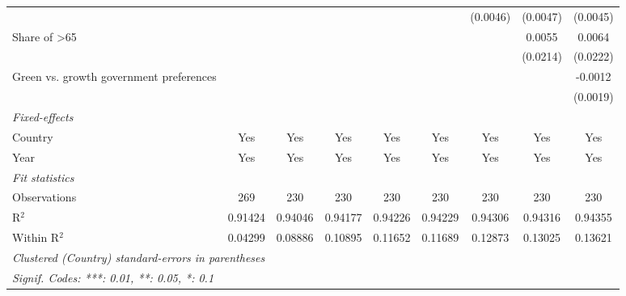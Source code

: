 \begin{table}[htbp]
\begin{tabular}{lcccccccc}
                                                       &               &               &          &          &          & (0.0046) & (0.0047) & (0.0045)\\   
      Share of >65                                     &               &               &          &          &          &          & 0.0055   & 0.0064\\   
                                                       &               &               &          &          &          &          & (0.0214) & (0.0222)\\   
      Green vs. growth government preferences          &               &               &          &          &          &          &          & -0.0012\\   
                                                       &               &               &          &          &          &          &          & (0.0019)\\   
      \midrule
      \emph{Fixed-effects}\\
      Country                                          & Yes           & Yes           & Yes      & Yes      & Yes      & Yes      & Yes      & Yes\\  
      Year                                             & Yes           & Yes           & Yes      & Yes      & Yes      & Yes      & Yes      & Yes\\  
      \midrule
      \emph{Fit statistics}\\
      Observations                                     & 269           & 230           & 230      & 230      & 230      & 230      & 230      & 230\\  
      R$^2$                                            & 0.91424       & 0.94046       & 0.94177  & 0.94226  & 0.94229  & 0.94306  & 0.94316  & 0.94355\\  
      Within R$^2$                                     & 0.04299       & 0.08886       & 0.10895  & 0.11652  & 0.11689  & 0.12873  & 0.13025  & 0.13621\\  
      \midrule \midrule
      \multicolumn{9}{l}{\emph{Clustered (Country) standard-errors in parentheses}}\\
      \multicolumn{9}{l}{\emph{Signif. Codes: ***: 0.01, **: 0.05, *: 0.1}}\\
   \end{tabular}
\end{table}


